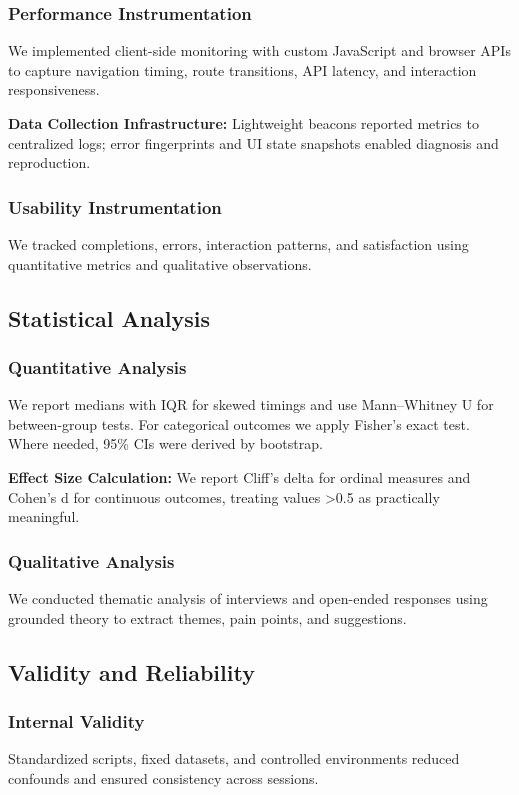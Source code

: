 \documentclass[conference]{IEEEtran}
\begin{document}
\subsubsection{Performance Instrumentation}
We implemented client-side monitoring with custom JavaScript and browser APIs to capture navigation timing, route transitions, API latency, and interaction responsiveness.

\textbf{Data Collection Infrastructure:} Lightweight beacons reported metrics to centralized logs; error fingerprints and UI state snapshots enabled diagnosis and reproduction.

\subsubsection{Usability Instrumentation}
We tracked completions, errors, interaction patterns, and satisfaction using quantitative metrics and qualitative observations.

\subsection{Statistical Analysis}

\subsubsection{Quantitative Analysis}
We report medians with IQR for skewed timings and use Mann–Whitney U for between-group tests. For categorical outcomes we apply Fisher's exact test. Where needed, 95\% CIs were derived by bootstrap.

\textbf{Effect Size Calculation:} We report Cliff's delta for ordinal measures and Cohen's d for continuous outcomes, treating values >0.5 as practically meaningful.

\subsubsection{Qualitative Analysis}
We conducted thematic analysis of interviews and open-ended responses using grounded theory to extract themes, pain points, and suggestions.

\subsection{Validity and Reliability}

\subsubsection{Internal Validity}
Standardized scripts, fixed datasets, and controlled environments reduced confounds and ensured consistency across sessions.
\end{document}
